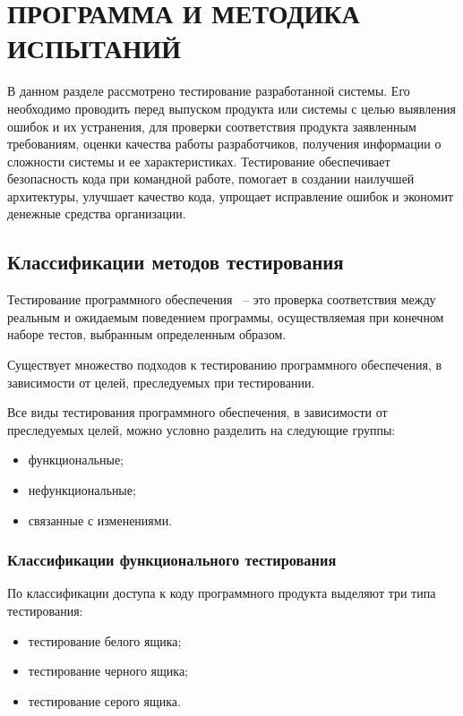 \section{ПРОГРАММА И МЕТОДИКА ИСПЫТАНИЙ}
\label{sec:testing}

В данном разделе рассмотрено тестирование разработанной системы.
Его необходимо проводить перед выпуском продукта или системы
с целью выявления ошибок и их устранения, для проверки соответствия продукта
заявленным требованиям, оценки качества работы разработчиков,
получения информации о сложности системы и ее характеристиках. Тестирование
обеспечивает безопасность кода при командной работе, помогает в создании наилучшей
архитектуры, улучшает качество кода, упрощает исправление ошибок и экономит денежные
средства организации.

\subsection{Классификации методов тестирования}

Тестирование программного обеспечения~\cite{testing_epam} -- это проверка 
соответствия между реальным и ожидаемым поведением программы, 
осуществляемая при конечном наборе тестов, выбранным определенным 
образом.

Существует множество подходов к тестированию программного 
обеспечения, в зависимости от целей, преследуемых при тестировании.

Все виды тестирования программного обеспечения, в зависимости от 
преследуемых целей, можно условно разделить на следующие группы:

\begin{itemize}
    \item функциональные;
    \item нефункциональные;
    \item связанные с изменениями.
\end{itemize}

\subsubsection{Классификации функционального тестирования}

По классификации доступа к коду программного продукта выделяют три 
типа тестирования:

\begin{itemize}
    \item тестирование белого ящика;
    \item тестирование черного ящика;
    \item тестирование серого ящика.
\end{itemize}

